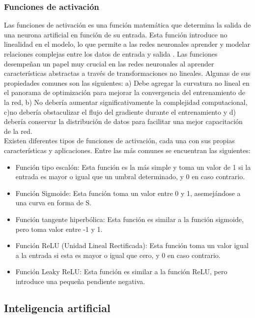 \subsubsection{Funciones de activación}

Las funciones de activación es una función matemática que determina la salida de una neurona artificial en función de su entrada. Esta función introduce no linealidad en el modelo, lo que permite a las redes neuronales aprender y modelar relaciones complejas entre los datos de entrada y salida \citep{dubey2022activation}. Las funciones desempeñan un papel muy crucial en las redes neuronales al aprender características abstractas a través de transformaciones no lineales. Algunas de sus propiedades comunes son las siguientes: a) Debe agregar la curvatura no lineal en el panorama de optimización para mejorar la convergencia del entrenamiento de la red, b) No debería aumentar significativamente la complejidad computacional, c)no debería obstaculizar el flujo del gradiente durante el entrenamiento y d) debería conservar la distribución de datos para facilitar una mejor capacitación de la red.\\

Existen diferentes tipos de funciones de activación, cada una con sus propias características y aplicaciones. Entre las más comunes se encuentran las siguientes:

\begin{itemize}
    \item Función tipo escalón: Esta función es la más simple y toma un valor de 1 si la entrada es mayor o igual que un umbral determinado, y 0 en caso contrario.
    \item Función Sigmoide: Esta función toma un valor entre 0 y 1, asemejándose a una curva en forma de S.
    \item Función tangente hiperbólica: Esta función es similar a la función sigmoide, pero toma valor entre -1 y 1.
    \item Función ReLU (Unidad Lineal Rectificada): Esta función toma un valor igual a la entrada si esta es mayor o igual que cero, y 0 en caso contrario.
    \item Función Leaky ReLU: Esta función es similar a la función ReLU, pero introduce una pequeña pendiente negativa.
\end{itemize}

\subsection{Inteligencia artificial}

